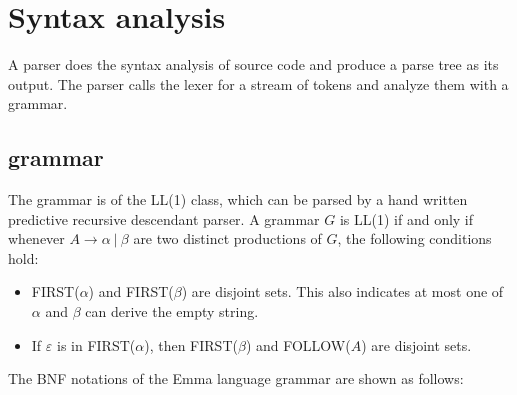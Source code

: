 \documentclass[10pt,a4paper]{article}
\begin{document}
\section{Syntax analysis}
A parser does the syntax analysis of source code and produce a parse tree
as its output. The parser calls the lexer for a stream of tokens and 
analyze them with a grammar.

\subsection{grammar}
The grammar is of the LL(1) class, which can be parsed by a hand written 
predictive recursive descendant parser. 
A grammar $G$ is LL(1) if and only if whenever $A \rightarrow \alpha\ |\ \beta$ 
are two distinct productions of $G$, the following conditions hold:
\begin{itemize}
\item FIRST($\alpha$) and FIRST($\beta$) are disjoint sets. This also indicates
at most one of $\alpha$ and $\beta$ can derive the empty string.
\item If $\varepsilon$ is in FIRST($\alpha$), then FIRST($\beta$) and 
FOLLOW($A$) are disjoint sets.
\end{itemize}

The BNF notations of the Emma language grammar are shown as follows:
\end{document}
